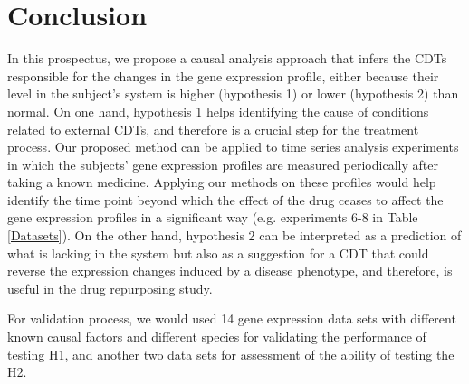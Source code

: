 \section{Conclusion}


In this prospectus, we propose a causal analysis approach that infers the CDTs responsible for the changes in the gene expression profile, either because their level in the subject's system is higher (hypothesis 1) or lower (hypothesis 2) than normal. 
On one hand,  hypothesis 1 helps identifying the cause of conditions related to external CDTs, and therefore is a crucial step for the treatment process. 
Our proposed method can be applied to time series analysis experiments in which the subjects' gene expression profiles are measured periodically after taking a known medicine. Applying our methods on these profiles would help identify the time point beyond which the effect of the drug ceases to affect the gene expression profiles in a significant way  (e.g. experiments 6-8 in Table \ref{Datasets}).
On the other hand, hypothesis 2 can be interpreted as a prediction of what is lacking in the system but also as a suggestion for a CDT that could reverse the expression changes induced by a disease phenotype, and therefore, is useful in the drug repurposing study. %




For validation process, we would used 14 gene expression data sets with different known causal factors and different species for validating the performance of testing H1, and another two data sets for assessment of the ability of testing the H2. %


